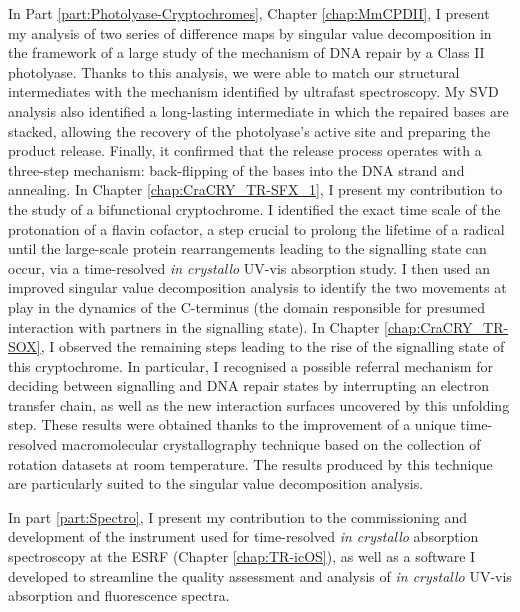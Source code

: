 \documentclass{report}
\begin{document}
In Part \ref{part:Photolyase-Cryptochromes}, Chapter \ref{chap:MmCPDII}, I present my analysis of two series of difference maps by singular value decomposition in the framework of a large study of the mechanism of DNA repair by a Class II photolyase. Thanks to this analysis, we were able to match our structural intermediates with the mechanism identified by ultrafast spectroscopy. My SVD analysis also identified a long-lasting intermediate in which the repaired bases are stacked, allowing the recovery of the photolyase's active site and preparing the product release. Finally, it confirmed that the release process operates with a three-step mechanism: back-flipping of the bases into the DNA strand and annealing. In Chapter \ref{chap:CraCRY_TR-SFX_1}, I present my contribution to the study of a bifunctional cryptochrome. I identified the exact time scale of the protonation of a flavin cofactor, a step crucial to prolong the lifetime of a radical until the large-scale protein rearrangements leading to the signalling state can occur, via a time-resolved \textit{in crystallo} UV-vis absorption study. I then used an improved singular value decomposition analysis to identify the two movements at play in the dynamics of the C-terminus (the domain responsible for presumed interaction with partners in the signalling state). In Chapter \ref{chap:CraCRY_TR-SOX}, I observed the remaining steps leading to the rise of the signalling state of this cryptochrome. In particular, I recognised a possible referral mechanism for deciding between signalling and DNA repair states by interrupting an electron transfer chain, as well as the new interaction surfaces uncovered by this unfolding step. These results were obtained thanks to the improvement of a unique time-resolved macromolecular crystallography technique based on the collection of rotation datasets at room temperature. The results produced by this technique are particularly suited to the singular value decomposition analysis. 


In part \ref{part:Spectro}, I present my contribution to the commissioning and development of the instrument used for time-resolved \textit{in crystallo} absorption spectroscopy at the ESRF (Chapter \ref{chap:TR-icOS}), as well as a software I developed to streamline the quality assessment and analysis of \textit{in crystallo} UV-vis absorption and fluorescence spectra. 

\vspace{2mm}
\end{document}
